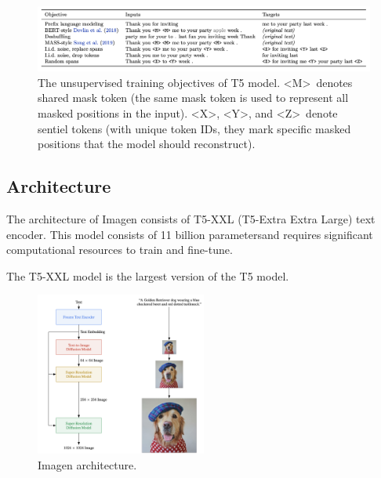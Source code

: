 \begin{figure}[h]
    \centering
    \includegraphics[width=1\textwidth]{images/imagen/t5_objectives.png}
    \caption{The unsupervised training objectives of T5 model. \textless M\textgreater\ denotes shared mask token (the same mask token is used to represent all masked positions in the input). \textless X\textgreater, \textless Y\textgreater, and \textless Z\textgreater\ denote sentiel tokens (with unique token IDs, they mark specific masked positions that the model should reconstruct).}
\end{figure}







\subsection{Architecture}

The architecture of Imagen consists of T5-XXL (T5-Extra Extra Large) text encoder. This model consists of 11 billion parametersand requires significant computational resources to train and fine-tune.

The T5-XXL model is the largest version of the T5 model.


\begin{figure}
    \centering
    \includegraphics[width=0.5\textwidth]{images/imagen/architecture.png}
    \caption{Imagen architecture.}
    \label{fig:imagen_architecture}
\end{figure}